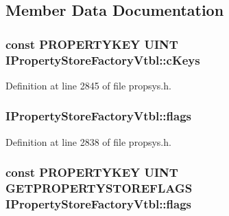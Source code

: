 \subsection{Member Data Documentation}
\subsubsection[{\texorpdfstring{c\+Keys}{cKeys}}]{ {\bf const} {\bf P\+R\+O\+P\+E\+R\+T\+Y\+K\+EY} {\bf U\+I\+NT} I\+Property\+Store\+Factory\+Vtbl\+::c\+Keys}\hypertarget{struct_i_property_store_factory_vtbl_abc207d34db2279bd8be50aa204c36889}{}\label{struct_i_property_store_factory_vtbl_abc207d34db2279bd8be50aa204c36889}


Definition at line 2845 of file propsys.\+h.

\subsubsection[{\texorpdfstring{flags}{flags}}]{ I\+Property\+Store\+Factory\+Vtbl\+::flags}\hypertarget{struct_i_property_store_factory_vtbl_a7da64db4ae405aeb538fc2545d49a196}{}\label{struct_i_property_store_factory_vtbl_a7da64db4ae405aeb538fc2545d49a196}


Definition at line 2838 of file propsys.\+h.

\subsubsection[{\texorpdfstring{flags}{flags}}]{ {\bf const} {\bf P\+R\+O\+P\+E\+R\+T\+Y\+K\+EY} {\bf U\+I\+NT} {\bf G\+E\+T\+P\+R\+O\+P\+E\+R\+T\+Y\+S\+T\+O\+R\+E\+F\+L\+A\+GS} I\+Property\+Store\+Factory\+Vtbl\+::flags}\hypertarget{struct_i_property_store_factory_vtbl_a846e6a8fc5c82413b5c963a666a3d82a}{}\label{struct_i_property_store_factory_vtbl_a846e6a8fc5c82413b5c963a666a3d82a}



